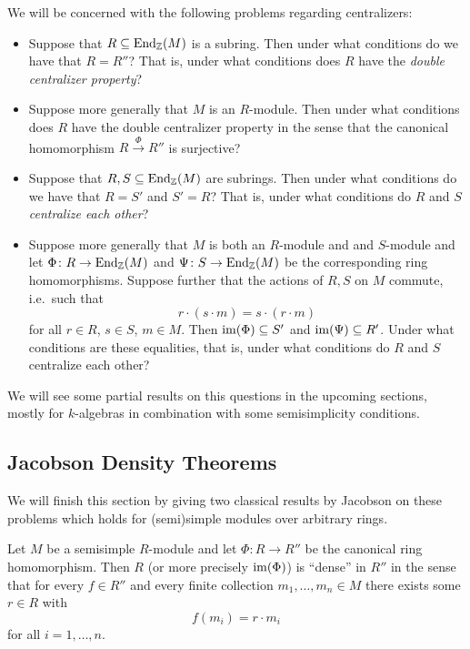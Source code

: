 \begin{fluff}
  We will be concerned with the following problems regarding centralizers:
  \begin{itemize}
    \item
      Suppose that $R \subseteq \operatorname{End}_{\mathbb{Z}}(M)$ is a subring.
      Then under what conditions do we have that $R = R''$?
      That is, under what conditions does $R$ have the \emph{double centralizer property}?
    \item
      Suppose more generally that $M$ is an $R$-module.
      Then under what conditions does $R$ have the double centralizer property in the sense that the canonical homomorphism $R \xrightarrow{\Phi} R''$ is surjective?
    \item
      Suppose that $R, S \subseteq \operatorname{End}_{\mathbb{Z}}(M)$ are subrings.
      Then under what conditions do we have that $R = S'$ and $S' = R$?
      That is, under what conditions do $R$ and $S$ \emph{centralize each other}?
    \item
      Suppose more generally that $M$ is both an $R$-module and and $S$-module and let $\Phi \colon R \to \operatorname{End}_{\mathbb{Z}}(M)$ and $\Psi \colon S \to \operatorname{End}_{\mathbb{Z}}(M)$ be the corresponding ring homomorphisms.
      Suppose further that the actions of $R, S$ on $M$ commute, i.e.\ such that
      \[
          r \cdot (s \cdot m)
        = s \cdot (r \cdot m)
      \]
      for all $r \in R$, $s \in S$, $m \in M$.
      Then $\operatorname{im}(\Phi) \subseteq S'$ and $\operatorname{im}(\Psi) \subseteq R'$.
      Under what conditions are these equalities, that is, under what conditions do $R$ and $S$ centralize each other?
  \end{itemize}
  
  We will see some partial results on this questions in the upcoming sections, mostly for $k$-algebras in combination with some semisimplicity conditions.
\end{fluff}





\subsection{Jacobson Density Theorems}


\begin{fluff}
  We will finish this section by giving two classical results by Jacobson on these problems which holds for (semi)simple modules over arbitrary rings.
\end{fluff}


\begin{theorem}
  \label{theorem: first jacobson density theorem}
  Let $M$ be a semisimple $R$-module and let $\Phi \colon R \to R''$ be the canonical ring homomorphism.
  Then $R$ (or more precisely $\operatorname{im}(\Phi)$) is \enquote{dense} in $R''$ in the sense that for every $f \in R''$ and every finite collection $m_1, \dotsc, m_n \in M$ there exists some $r \in R$ with
  \[
      f(m_i)
    = r \cdot m_i
  \]
  for all $i = 1, \dotsc, n$.
\end{theorem}


